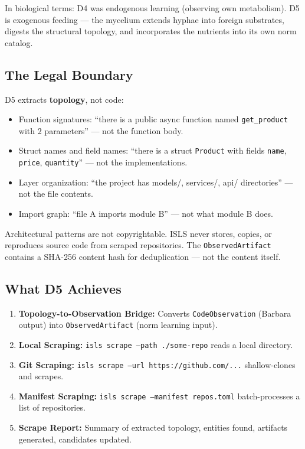 \documentclass[11pt,a4paper]{article}
\begin{document}
In biological terms: D4 was endogenous learning (observing own metabolism).
D5 is exogenous feeding --- the mycelium extends hyphae into foreign
substrates, digests the structural topology, and incorporates the nutrients
into its own norm catalog.

\subsection{The Legal Boundary}

D5 extracts \textbf{topology}, not code:

\begin{itemize}[nosep]
\item Function signatures: ``there is a public async function named
      \texttt{get\_product} with 2 parameters'' --- not the function body.
\item Struct names and field names: ``there is a struct \texttt{Product}
      with fields \texttt{name}, \texttt{price}, \texttt{quantity}'' ---
      not the implementations.
\item Layer organization: ``the project has models/, services/, api/
      directories'' --- not the file contents.
\item Import graph: ``file A imports module B'' --- not what module B does.
\end{itemize}

Architectural patterns are not copyrightable. ISLS never stores, copies,
or reproduces source code from scraped repositories. The
\texttt{ObservedArtifact} contains a SHA-256 content hash for deduplication
--- not the content itself.

\subsection{What D5 Achieves}

\begin{enumerate}[nosep]
\item \textbf{Topology-to-Observation Bridge:} Converts
      \texttt{CodeObservation} (Barbara output) into
      \texttt{ObservedArtifact} (norm learning input).
\item \textbf{Local Scraping:} \texttt{isls scrape --path ./some-repo}
      reads a local directory.
\item \textbf{Git Scraping:} \texttt{isls scrape --url https://github.com/...}
      shallow-clones and scrapes.
\item \textbf{Manifest Scraping:} \texttt{isls scrape --manifest repos.toml}
      batch-processes a list of repositories.
\item \textbf{Scrape Report:} Summary of extracted topology, entities
      found, artifacts generated, candidates updated.
\end{enumerate}
\end{document}
